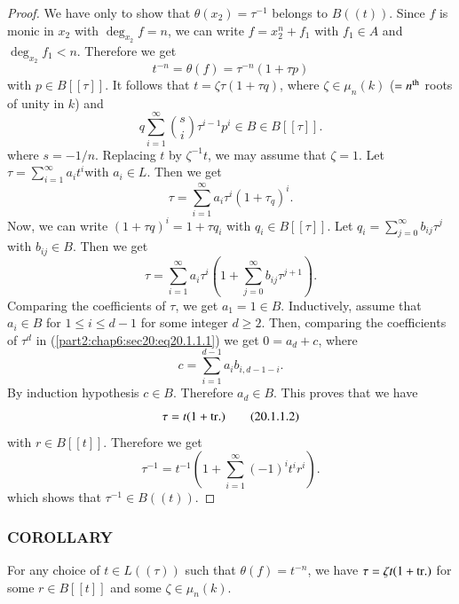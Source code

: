 \begin{proof}
  We have only to show that $\theta (x_2)= \tau^{-1}$ belongs to
  $B((t))$. Since $f$ is monic in $x_2$ with $\deg_{x_2} f=n$, we can
  write $f= x_2^n+ f_1$ with $f_1 \in A$ and $\deg_{x_2} f_1 <
  n$. Therefore we get
  $$
  t^{-n} = \theta (f) = \tau^{-n} (1+ \tau p)
  $$
  with $p \in B[[\tau]]$. It follows that $t= \zeta \tau(1+\tau q)$,
  where $\zeta \in \mu_n (k)$ ($= n^{\rm th}$ roots of unity in $k$) and 
$$
q \sum_{i=1}^\infty \binom{s}{i} \tau^{i-1} p^i \in B \in B[[\tau]].
 $$
where $s=- 1/n$. Replacing $t$ by $\zeta^{-1} t$, we may assume that
$\zeta =1$. Let $\tau = \displaystyle{\sum_{i=1}^\infty} a_i t^i$\pageoriginale with
$a_i \in L$. Then we get
$$
\tau = \sum^\infty_{i=1} a_i \tau^i (1 + \tau_q)^i.
$$
Now, we can write $(1 +  \tau q)^i= 1+ \tau q_i$ with $q_i \in B
[[\tau]]$. Let $q_i = \displaystyle{\sum^\infty_{j=0}}b_{ij} \tau^j$
with $b_{ij} \in B$. Then we get
\begin{equation*}
  \tau = \sum^\infty_{i=1} a_i \tau^i \left(1+ \sum^\infty_{j=0}
  b_{ij} \tau^{j+1}\right). \tag{20.1.1.1}\label{part2:chap6:sec20:eq20.1.1.1} 
\end{equation*}
Comparing the coefficients of $\tau$, we get $a_1 = 1 \in
B$. Inductively, assume that $a_i \in B$ for $ 1 \leq i \leq d -1$ for
some integer $d \geq 2$. Then, comparing the coefficients of $\tau^d$
in (\ref{part2:chap6:sec20:eq20.1.1.1}) we get $0= a_d+c$, where
$$
c= \sum_{i=1}^{d-1} a_i b_{i, d-1-i}.
$$
By induction hypothesis $c \in B$. Therefore $a_d \in B$. This proves
that we have 
\begin{equation*}
  \tau = t(1+ \operatorname{tr.})\tag{20.1.1.2}\label{part2:chap6:sec20:eq20.1.1.2} 
\end{equation*}
with $r \in B [[t]]$. Therefore we get
$$
\tau^{-1} = t^{-1} \left(1+ \sum^\infty_{i=1} (-1)^i t^i r^i \right).
$$
which shows that $\tau^{-1} \in B ((t))$.
\end{proof}


\subsubsection{COROLLARY}\label{part2:chap6:sec20:sss20.1.2}

For any choice of $t \in L ((\tau))$ such that $\theta (f) = t^{-n}$,
we have $\tau = \zeta t(1+ \operatorname{tr.})$ for some $r \in B[[t]]$ and some
$\zeta \in \mu_n (k)$.


